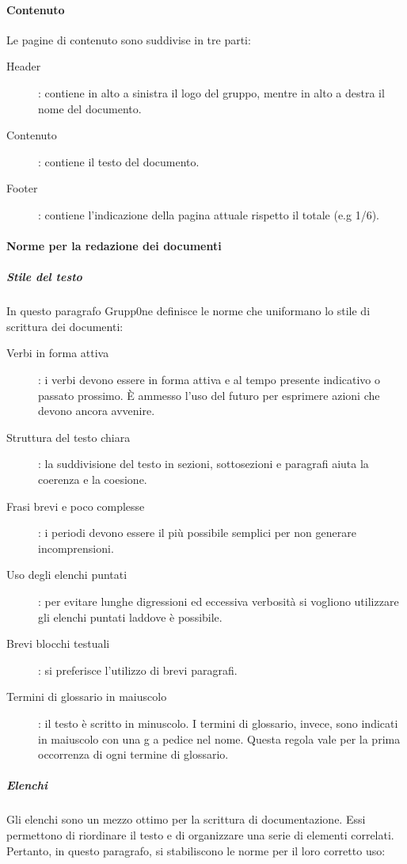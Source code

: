 \documentclass[../norme-di-progetto.tex]{subfiles}
\begin{document}
\paragraph{Contenuto}%
\label{par:contenuto}
Le pagine di contenuto sono suddivise in tre parti:
\begin{description}
  \item [Header]: contiene in alto a sinistra il logo del gruppo, mentre in alto a destra il nome del documento.
  \item [Contenuto]: contiene il testo del documento.
  \item [Footer]: contiene l'indicazione della pagina attuale rispetto il totale (e.g 1/6).
\end{description}

\paragraph{Norme per la redazione dei documenti}%
\label{par:norme per la redazione dei documenti}

\subparagraph{Stile del testo}%
\label{subp:stile del testo}
In questo paragrafo Grupp0ne definisce le norme che uniformano lo stile di scrittura dei documenti:
\begin{description}
    \item [Verbi in forma attiva]: i verbi devono essere in forma attiva e al tempo presente indicativo o passato prossimo. È ammesso l'uso del futuro per esprimere azioni che devono ancora avvenire.
    \item [Struttura del testo chiara]: la suddivisione del testo in sezioni, sottosezioni e paragrafi aiuta la coerenza e la coesione.
    \item [Frasi brevi e poco complesse]: i periodi devono essere il più possibile semplici per non generare incomprensioni.
    \item [Uso degli elenchi puntati]: per evitare lunghe digressioni ed eccessiva verbosità si vogliono utilizzare gli elenchi puntati laddove è possibile.
    \item [Brevi blocchi testuali]: si preferisce l'utilizzo di brevi paragrafi.
    \item [Termini di glossario in maiuscolo]: il testo è scritto in minuscolo. I termini di glossario, invece, sono indicati in maiuscolo con una g a pedice nel nome. Questa regola vale per la prima occorrenza di ogni termine di glossario.
\end{description}

\subparagraph{Elenchi }%
\label{subp:elenchi}
Gli elenchi sono un mezzo ottimo per la scrittura di documentazione. Essi permettono di riordinare il testo e di organizzare una serie di elementi correlati. Pertanto, in questo paragrafo, si stabiliscono le norme per il loro corretto uso:
\end{document}
